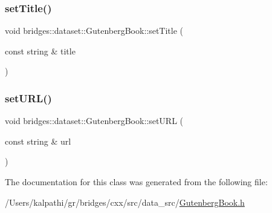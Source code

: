 \mbox{\label{classbridges_1_1dataset_1_1_gutenberg_book_a92b2299297a63bb95cb32edb236c29cd}} 
\subsubsection{\texorpdfstring{setTitle()}{setTitle()}}
{\footnotesize\ttfamily void bridges\+::dataset\+::\+Gutenberg\+Book\+::set\+Title (\begin{DoxyParamCaption}\item[{const string \&}]{title }\end{DoxyParamCaption})\hspace{0.3cm}{\ttfamily [inline]}}

\mbox{\label{classbridges_1_1dataset_1_1_gutenberg_book_aaa548eeb0e8512f95e3e0ea2bf6d7e9f}} 
\subsubsection{\texorpdfstring{setURL()}{setURL()}}
{\footnotesize\ttfamily void bridges\+::dataset\+::\+Gutenberg\+Book\+::set\+U\+RL (\begin{DoxyParamCaption}\item[{const string \&}]{url }\end{DoxyParamCaption})\hspace{0.3cm}{\ttfamily [inline]}}



The documentation for this class was generated from the following file\+:\begin{DoxyCompactItemize}
\item 
/\+Users/kalpathi/gr/bridges/cxx/src/data\+\_\+src/\mbox{\hyperlink{_gutenberg_book_8h}{Gutenberg\+Book.\+h}}\end{DoxyCompactItemize}
